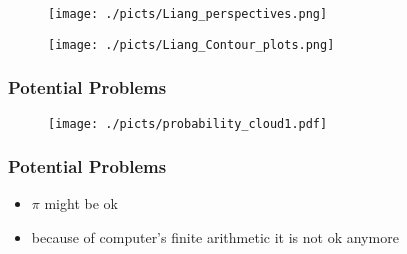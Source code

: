 
\begin{frame}[plain]

	\begin{center}
		\begin{figure}\texttt{[image: ./picts/Liang\_perspectives.png]}\end{figure}	
	\end{center}	
		
\end{frame}


\begin{frame}[plain]

	\begin{center}
		\begin{figure}\texttt{[image: ./picts/Liang\_Contour\_plots.png]}\end{figure}	
	\end{center}	
		
\end{frame}


\begin{frame}
		\frametitle{ Potential Problems }

	\begin{center}
		\begin{figure}\texttt{[image: ./picts/probability\_cloud1.pdf]}\end{figure}	
	\end{center}
\end{frame}



\begin{frame}
		\frametitle{ Potential Problems }

	\begin{itemize}
		\item $\pi$ might be ok 
		\item because of computer's finite arithmetic it is not ok anymore
	\end{itemize}

\end{frame}



